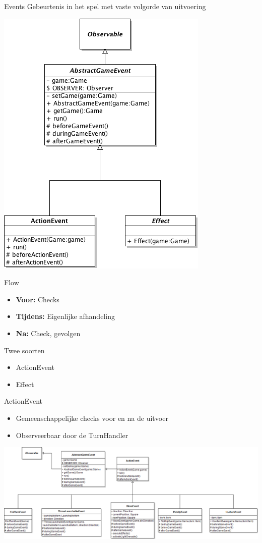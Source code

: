 \documentclass[t]{beamer}
\begin{document}
\begin{frame}{Events}
Gebeurtenis in het spel met vaste volgorde van uitvoering

\begin{multicols}{2}
\begin{center}
\includegraphics[width=0.60\linewidth]{images/GameEvent}
\end{center}
Flow
\begin{itemize}
	\item \textbf{Voor:} Checks
	\item \textbf{Tijdens:} Eigenlijke afhandeling
	\item \textbf{Na:} Check, gevolgen
\end{itemize}
Twee soorten
\begin{itemize}
	\item ActionEvent
	\item Effect
\end{itemize}
\end{multicols}
\end{frame}

\begin{frame}{ActionEvent}
\begin{center}
\begin{itemize}
	\item Gemeenschappelijke checks voor en na de uitvoer
	\item Observeerbaar door de TurnHandler
\end{itemize}
\vspace{0.1in}
\includegraphics[width=1\linewidth]{images/ActionEvents}
\end{center}
\end{frame}
\end{document}
